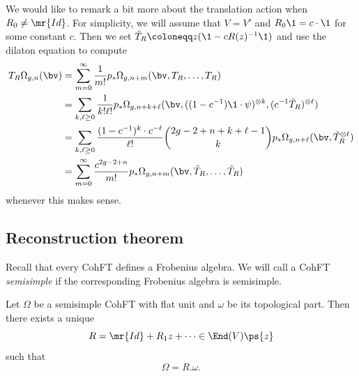 We would like to remark a bit more about the translation action when $R_0 \neq \mr{Id}$. For simplicity, we will assume that $V = V'$ and $R_0 \1 = c \cdot \1$ for some constant $c$. Then we set $\tilde{T}_R \coloneqq z( \1 - c R(z)^{-1} \1)$ and use the dilaton equation to compute
\begin{align*}
    T_R \Omega_{g,n}(\bv) &= \sum_{m=0}^{\infty} \frac{1}{m!} p_*\Omega_{g,n+m}(\bv, T_R, \ldots, T_R) \\
    &= \sum_{k,\ell \geq 0} \frac{1}{k!\ell!} p_* \Omega_{g,n+k+\ell}(\bv, ( (1-c^{-1})\1 \cdot \psi )^{\otimes k}, ( c^{-1} \tilde{T}_R )^{\otimes \ell}) \\
    &= \sum_{k,\ell \geq 0} \frac{(1-c^{-1})^k \cdot c^{-\ell}}{\ell!} \binom{2g-2+n+k+\ell-1}{k} p_* \Omega_{g,n+\ell}(\bv, \tilde{T}_R^{\otimes \ell}) \\
    &= \sum_{m=0}^{\infty} \frac{c^{2g-2+n}}{m!} p_* \Omega_{g,n+m}(\bv, \tilde{T}_R, \ldots, \tilde{T}_R)
\end{align*}
whenever this makes sense.


\subsection{Reconstruction theorem}%
\label{sub:Reconstruction theorem}

Recall that every CohFT defines a Frobenius algebra. We will call a CohFT \textit{semisimple} if the corresponding Frobenius algebra is semisimple.

\begin{thm}%
\label{thm:teleman}
    Let $\Omega$ be a semisimple CohFT with flat unit and $\omega$ be its topological part. Then there exists a unique 
    \[ R = \mr{Id} + R_1 z + \cdots \in \End(V)\ps{z} \]
    such that
    \[ \Omega = R.\omega. \]
\end{thm}


